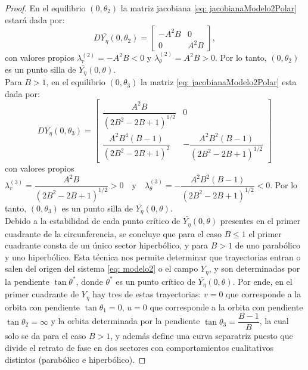 \documentclass[]{article}
\theoremstyle{remark}
\begin{document}
\begin{proof}
		\noindent En el equilibrio $(0,\theta_2)$ la matriz jacobiana \eqref{eq: jacobianaModelo2Polar} estará dada por:
		\begin{equation*}
			D\bar{Y_{\eta}}(0,\theta_2) =
			\begin{bmatrix}
				-A^{2}B  & 0 \\
				0 & A^{2}B
			\end{bmatrix},
		\end{equation*}
		con valores propios $\lambda_r^{(2)} = -A^{2}B<0$ y $\lambda_\theta^{(2)} = A^{2}B>0$. Por lo tanto, $\left(0,\theta_2\right)$ es un punto silla de $\bar{Y_{\eta}}(0,\theta)$. \\
		
		\noindent Para $B>1$, en el equilibrio $(0,\theta_3)$ la matriz \eqref{eq: jacobianaModelo2Polar} esta dada por:
		\begin{equation*}
			D\bar{Y_{\eta}}\left(0,\theta_3\right) =
			\begin{bmatrix}
				\dfrac{A^2 B}{(2B^{2}-2B+1)^{1/2}} & 0 \\
				\dfrac{A^2 B^4 (B-1)}{(2B^{2}-2B+1)^{2}} & -\dfrac{A^2 B^2 (B-1)}{(2B^{2}-2B+1)^{1/2}}
			\end{bmatrix}
		\end{equation*}
		con valores propios $\lambda_r^{(3)} = \dfrac{A^2 B}{(2B^{2}-2B+1)^{1/2}}>0 \quad \text{y} \quad \lambda_\theta^{(3)} = -\dfrac{A^2 B^2 (B-1)}{(2B^{2}-2B+1)^{1/2}}<0.$ Por lo tanto, $(0,\theta_3)$ es un punto silla de $\bar{Y_{\eta}}(0,\theta)$. \\
		
		\noindent Debido a la estabilidad de cada punto crítico de $\bar{Y_{\eta}}(0, \theta)$ presentes en el primer cuadrante de la circunferencia, se concluye que para el caso $B\leq1$ el primer cuadrante consta de un único sector hiperbólico, y para $B>1$ de uno parabólico y uno hiperbólico. Esta técnica nos permite determinar que trayectorias entran o salen del origen del sistema \eqref{eq: modelo2} o el campo $Y_{\eta}$, y son determinadas por la pendiente $\tan \theta^*$, donde $\theta^*$ es un punto crítico de $\bar{Y_{\eta}}(0,\theta)$. Por ende, en el primer cuadrante de $Y_{\eta}$ hay tres de estas trayectorias: $v=0$ que corresponde a la orbita con pendiente $\tan\theta_1=0$, $u=0$ que corresponde a la orbita con pendiente $\tan\theta_2= \infty$ y la orbita determinada por la pendiente $\tan\theta_3=\dfrac{B-1}{B}$, la cual solo se da para el caso $B>1$, y además define una curva separatriz puesto que divide el retrato de fase en dos sectores con comportamientos cualitativos distintos (parabólico e hiperbólico).
	\end{proof}
	
\end{document}
